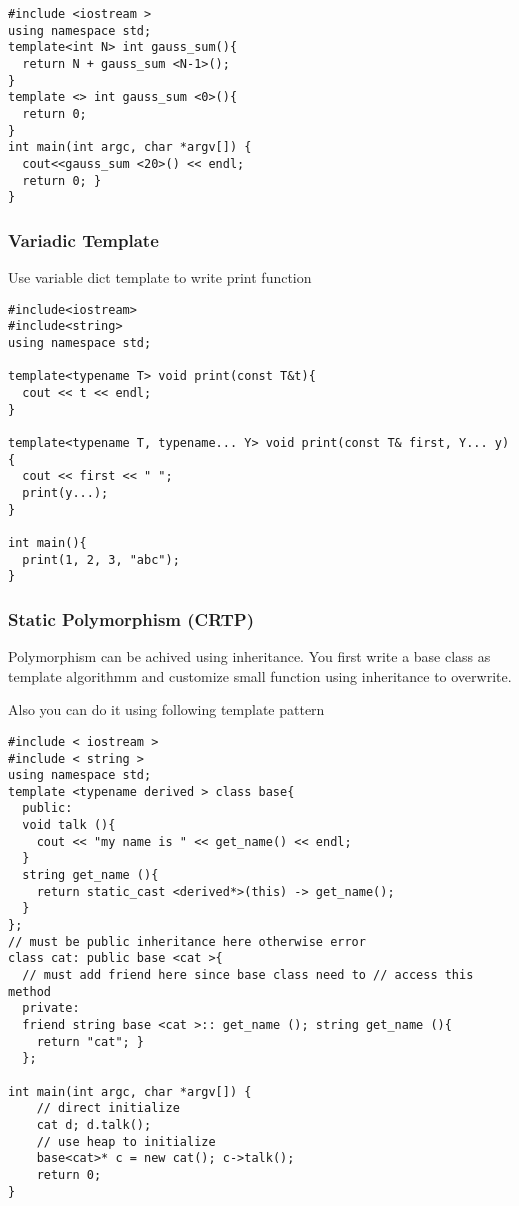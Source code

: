 \begin{lstlisting}
#include <iostream >
using namespace std;
template<int N> int gauss_sum(){
  return N + gauss_sum <N-1>();
}
template <> int gauss_sum <0>(){
  return 0;
}
int main(int argc, char *argv[]) {
  cout<<gauss_sum <20>() << endl;
  return 0; }
}
\end{lstlisting}

\subsubsection{Variadic Template}

Use variable dict template to write print function

\begin{lstlisting}
#include<iostream>
#include<string>
using namespace std;

template<typename T> void print(const T&t){
  cout << t << endl;
}

template<typename T, typename... Y> void print(const T& first, Y... y){
  cout << first << " ";
  print(y...);
}

int main(){
  print(1, 2, 3, "abc");
}
\end{lstlisting}

\subsubsection{Static Polymorphism (CRTP)}
Polymorphism can be achived using inheritance. You first write a base class as template algorithmm and customize small function using inheritance to overwrite.

Also you can do it using following template pattern
\begin{lstlisting}
#include < iostream >
#include < string >
using namespace std;
template <typename derived > class base{
  public:
  void talk (){
    cout << "my name is " << get_name() << endl;
  }
  string get_name (){
    return static_cast <derived*>(this) -> get_name();
  }
};
// must be public inheritance here otherwise error
class cat: public base <cat >{
  // must add friend here since base class need to // access this method
  private:
  friend string base <cat >:: get_name (); string get_name (){
    return "cat"; }
  };

int main(int argc, char *argv[]) {
    // direct initialize
    cat d; d.talk();
    // use heap to initialize
    base<cat>* c = new cat(); c->talk();
    return 0;
}


\end{lstlisting}

